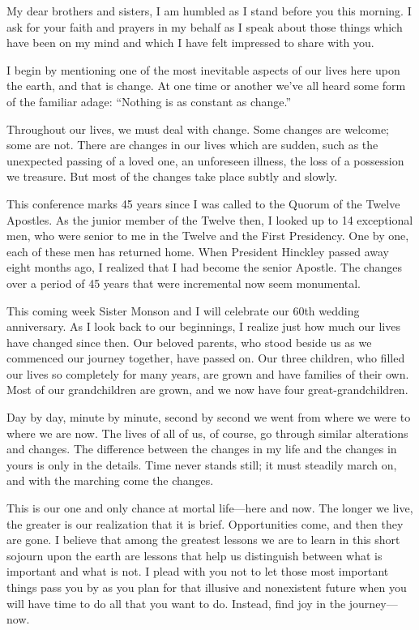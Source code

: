 \documentclass[letterpaper, 11pt]{report}
\newcommand{\speaker}{}
\newcommand{\talk}{}
\newcommand{\setspeaker}[1]{\renewcommand{\speaker}{#1}}
\newcommand{\settalk}[1]{\renewcommand{\talk}{#1}}
\newcommand{\talkheading}[2]{%
    \vspace{1em}
    \noindent{\huge\bfseries #1}
    \par\nopagebreak\vspace{0.25em}
    \noindent{\normalsize\bfseries #2}
    \par\nopagebreak\vspace{0.5em}
}
\begin{document}
\newpage
\settalk{Finding Joy In The Journey}
\setspeaker{Thomas S. Monson}
\talkheading{Finding Joy In The Journey}{Thomas S. Monson}

My dear brothers and sisters, I am humbled as I stand before you this morning. I ask for your faith and prayers in my behalf as I speak about those things which have been on my mind and which I have felt impressed to share with you.

I begin by mentioning one of the most inevitable aspects of our lives here upon the earth, and that is change. At one time or another we’ve all heard some form of the familiar adage: “Nothing is as constant as change.”

Throughout our lives, we must deal with change. Some changes are welcome; some are not. There are changes in our lives which are sudden, such as the unexpected passing of a loved one, an unforeseen illness, the loss of a possession we treasure. But most of the changes take place subtly and slowly.

This conference marks 45 years since I was called to the Quorum of the Twelve Apostles. As the junior member of the Twelve then, I looked up to 14 exceptional men, who were senior to me in the Twelve and the First Presidency. One by one, each of these men has returned home. When President Hinckley passed away eight months ago, I realized that I had become the senior Apostle. The changes over a period of 45 years that were incremental now seem monumental.

This coming week Sister Monson and I will celebrate our 60th wedding anniversary. As I look back to our beginnings, I realize just how much our lives have changed since then. Our beloved parents, who stood beside us as we commenced our journey together, have passed on. Our three children, who filled our lives so completely for many years, are grown and have families of their own. Most of our grandchildren are grown, and we now have four great-grandchildren.

Day by day, minute by minute, second by second we went from where we were to where we are now. The lives of all of us, of course, go through similar alterations and changes. The difference between the changes in my life and the changes in yours is only in the details. Time never stands still; it must steadily march on, and with the marching come the changes.

This is our one and only chance at mortal life—here and now. The longer we live, the greater is our realization that it is brief. Opportunities come, and then they are gone. I believe that among the greatest lessons we are to learn in this short sojourn upon the earth are lessons that help us distinguish between what is important and what is not. I plead with you not to let those most important things pass you by as you plan for that illusive and nonexistent future when you will have time to do all that you want to do. Instead, find joy in the journey—now.
\end{document}
